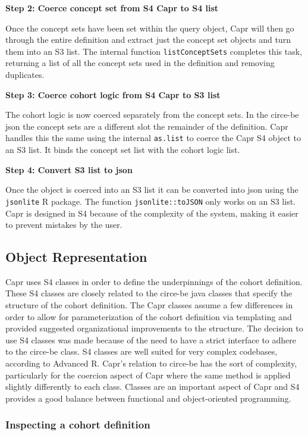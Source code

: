 \documentclass[
]{article}
\begin{document}
\textbf{Step 2: Coerce concept set from S4 Capr to S4 list}

Once the concept sets have been set within the query object, Capr will
then go through the entire definition and extract just the concept set
objects and turn them into an S3 list. The internal function
\texttt{listConceptSets} completes this task, returning a list of all
the concept sets used in the definition and removing duplicates.

\textbf{Step 3: Coerce cohort logic from S4 Capr to S3 list}

The cohort logic is now coerced separately from the concept sets. In the
circe-be json the concept sets are a different slot the remainder of the
definition. Capr handles this the same using the internal
\texttt{as.list} to coerce the Capr S4 object to an S3 list. It binds
the concept set list with the cohort logic list.

\textbf{Step 4: Convert S3 list to json}

Once the object is coerced into an S3 list it can be converted into json
using the \texttt{jsonlite} R package. The function
\texttt{jsonlite::toJSON} only works on an S3 list. Capr is designed in
S4 because of the complexity of the system, making it easier to prevent
mistakes by the user.

\subsection{Object Representation}\label{object-representation}

Capr uses S4 classes in order to define the underpinnings of the cohort
definition. These S4 classes are closely related to the circe-be java
classes that specify the structure of the cohort definition. The Capr
classes assume a few differences in order to allow for parameterization
of the cohort definition via templating and provided suggested
organizational improvements to the structure. The decision to use S4
classes was made because of the need to have a strict interface to
adhere to the circe-be class. S4 classes are well suited for very
complex codebases, according to Advanced R. Capr's relation to circe-be
has the sort of complexity, particularly for the coercion aspect of Capr
where the same method is applied slightly differently to each class.
Classes are an important aspect of Capr and S4 provides a good balance
between functional and object-oriented programming.

\subsubsection{Inspecting a cohort
definition}\label{inspecting-a-cohort-definition}
\end{document}
